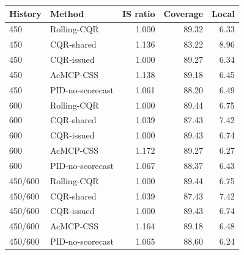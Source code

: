 \begin{tabular}{llrrr}
\toprule
History & Method & IS ratio & Coverage & Local \\
\midrule
450 & Rolling-CQR & 1.000 & 89.32 & 6.33 \\
450 & CQR-shared & 1.136 & 83.22 & 8.96 \\
450 & CQR-issued & 1.000 & 89.27 & 6.34 \\
450 & AcMCP-CSS & 1.138 & 89.18 & 6.45 \\
450 & PID-no-scorecast & 1.061 & 88.20 & 6.49 \\
600 & Rolling-CQR & 1.000 & 89.44 & 6.75 \\
600 & CQR-shared & 1.039 & 87.43 & 7.42 \\
600 & CQR-issued & 1.000 & 89.43 & 6.74 \\
600 & AcMCP-CSS & 1.172 & 89.27 & 6.27 \\
600 & PID-no-scorecast & 1.067 & 88.37 & 6.43 \\
450/600 & Rolling-CQR & 1.000 & 89.44 & 6.75 \\
450/600 & CQR-shared & 1.039 & 87.43 & 7.42 \\
450/600 & CQR-issued & 1.000 & 89.43 & 6.74 \\
450/600 & AcMCP-CSS & 1.164 & 89.18 & 6.48 \\
450/600 & PID-no-scorecast & 1.065 & 88.60 & 6.24 \\
\bottomrule
\end{tabular}
